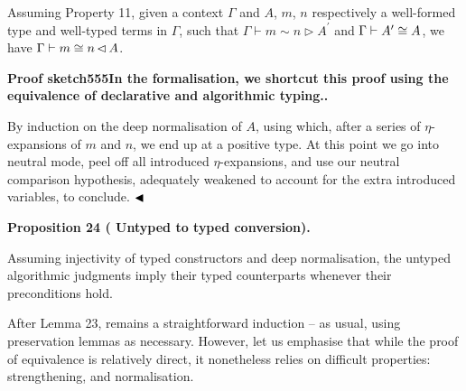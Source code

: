  
Assuming Property 11, given a context $\Gamma$ and $A$, $m$, $n$ respectively a well-formed type and well-typed terms in $\Gamma$, such that $\Gamma\vdash m\sim n\mathrel{\rhd}A^{\prime}$ and $\Gamma\vdash A^{\prime}\mathrel{\raisebox{-0.5pt}{$\cong$}}A$, we have $\Gamma\vdash m\mathrel{\raisebox{-0.5pt}{$\cong$}}n\operatorname{\mathrel{\lhd%
}}{A}$.\par
 
 
 
 
 
\par\medskip\noindent\textbf{Proof sketch555In the formalisation, we shortcut this proof using the equivalence of declarative and algorithmic typing..}\par
 
 
By induction on the deep normalisation of $A$, using which, after a series of $\eta$-expansions of $m$ and $n$, we end up at a positive type. At this point we go into neutral mode, peel off all introduced $\eta$-expansions, and use our neutral comparison hypothesis, adequately weakened to account for the extra introduced variables, to conclude. $\hfill\blacktriangleleft$\par
 
 
 
\par\medskip\noindent\textbf{Proposition 24 (  Untyped to typed conversion).}\par
 
 
Assuming injectivity of typed constructors and deep normalisation, the untyped algorithmic judgments imply their typed counterparts whenever their preconditions hold.\par
 
 
 
 
After Lemma 23, remains a straightforward induction – as usual, using preservation lemmas as necessary. However, let us emphasise that while the proof of equivalence is relatively direct, it nonetheless relies on difficult properties: strengthening, and normalisation.\par
 
